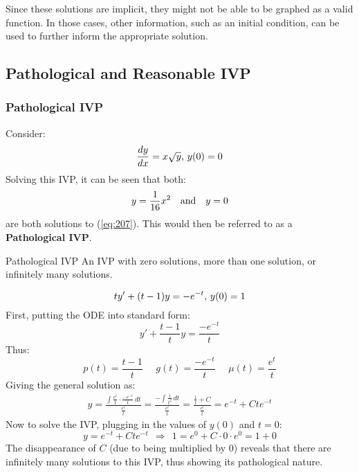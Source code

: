 \documentclass[12pt]{article}
\begin{document}
Since these solutions are implicit, they might not be able to be graphed as a valid function. In those cases, other information, such as an initial condition, can be used to further inform the appropriate solution.

\subsection{Pathological and Reasonable IVP}
\label{ssec:pathologicalAndReasonableIVP}

\subsubsection{Pathological IVP}
\label{sssec:pathologicalIVP}

Consider:
\begin{equation}
  \frac{dy}{dx}=x \sqrt{y}\textup{, }y(0) = 0
  \label{eq:207}
\end{equation}
Solving this IVP, it can be seen that both:
\begin{equation*}
  y = \frac{1}{16}x^2\ \ \ \textup{and}\ \ \ y=0
\end{equation*}
are both solutions to (\ref{eq:207}). This would then be referred to as a \textbf{Pathological IVP}.

\begin{definition}{Pathological IVP}
  An IVP with zero solutions, more than one solution, or infinitely many solutions.
\end{definition}

\begin{example}
  \begin{equation*}
    ty'+(t-1)y = -e^{-t}\textup{,}\ y(0) = 1
  \end{equation*}
  First, putting the ODE into standard form:
  \begin{equation*}
    y'+ \frac{t-1}{t}y = \frac{-e^{-t}}{t}
  \end{equation*}
  Thus:
  \begin{equation*}
    p(t) = \frac{t-1}{t}\ \ \ \ \ \ g(t) = \frac{-e^{-t}}{t}\ \ \ \ \ \ \mu(t) = \frac{e^t}{t}
  \end{equation*}
  Giving the general solution as:
  \begin{align*}
    y = \frac{\int \frac{e^t}{t} \cdot \frac{-e^{-t}}{t} \,dt}{\frac{e^t}{t}} = \frac{-\int \frac{1}{t^2} \,dt}{\frac{e^t}{t}} = \frac{\frac{1}{t} + C}{\frac{e^t}{t}} = e^{-t} + Cte^{-t}
  \end{align*}
  Now to solve the IVP, plugging in the values of $y(0)$ and $t=0$:
  \begin{equation*}
    y = e^{-t} + Cte^{-t}\ \  \Rightarrow\ \ 1 = e^{0} + C \cdot 0 \cdot e^{0} = 1 + 0
  \end{equation*}
  The disappearance of $C$ (due to being multiplied by $0$) reveals that there are infinitely many solutions to this IVP, thus showing its pathological nature.
\end{example}
\end{document}
